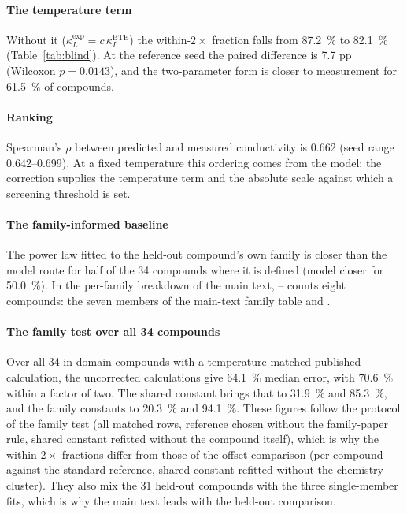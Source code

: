 \documentclass[preprint, 12pt]{elsarticle}
\begin{document}
\paragraph{The temperature term} Without it ($\kappa_L^{\mathrm{exp}} = c\,\kappa_L^{\mathrm{BTE}}$)
the within-$2\times$ fraction falls from \SI{87.2}{\percent} to \SI{82.1}{\percent}
(Table~\ref{tab:blind}). At the reference seed the paired difference is \num{7.7} pp (Wilcoxon
$p=\num{0.0143}$), and the two-parameter form is closer to measurement for \SI{61.5}{\percent} of
compounds.

\paragraph{Ranking} Spearman's $\rho$ between predicted and measured conductivity is \num{0.662}
(seed range \numrange{0.642}{0.699}). At a fixed temperature this ordering comes from the model; the
correction supplies the temperature term and the absolute scale against which a screening threshold
is set.

\paragraph{The family-informed baseline} The power law fitted to the held-out compound's own family
is closer than the model route for half of the \num{34} compounds where it is defined (model closer
for \SI{50.0}{\percent}). In the per-family breakdown of the main text, -- counts eight
compounds: the seven members of the main-text family table and .

\paragraph{The family test over all 34 compounds} Over all \num{34} in-domain compounds with a
temperature-matched published calculation, the uncorrected calculations give \SI{64.1}{\percent}
median error, with \SI{70.6}{\percent} within a factor of two. The shared constant brings that to
\SI{31.9}{\percent} and \SI{85.3}{\percent}, and the family constants to \SI{20.3}{\percent} and
\SI{94.1}{\percent}. These figures follow the protocol of the family test (all matched rows,
reference chosen without the family-paper rule, shared constant refitted without the compound
itself), which is why the within-$2\times$ fractions differ from those of the offset comparison
(per compound against the standard reference, shared constant refitted without the chemistry
cluster). They also mix the \num{31} held-out compounds with the three single-member fits, which is
why the main text leads with the held-out comparison.
\end{document}
